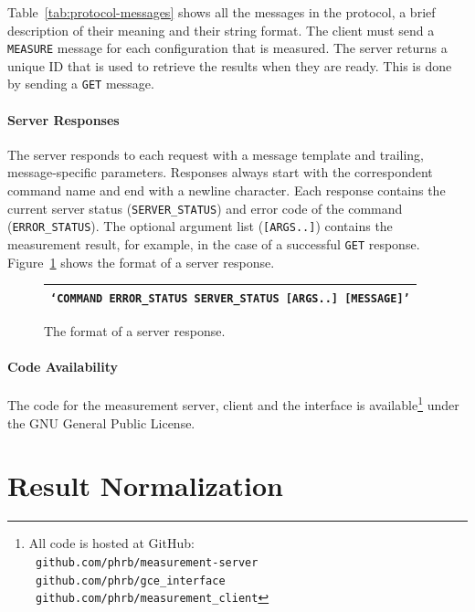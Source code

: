 \documentclass[a4paper, 12pt]{article}
\begin{document}
Table~\ref{tab:protocol-messages} shows all the messages in the protocol,
a brief description of their meaning and their string format. The client
must send a \texttt{\footnotesize MEASURE} message for each configuration
that is measured. The server returns a unique ID that is used to retrieve
the results when they are ready. This is done by sending a
\texttt{\footnotesize GET} message.

\paragraph{Server Responses}

The server responds to each request with a message template and
trailing, message-specific parameters. Responses always start
with the correspondent command name and end with a newline character.
Each response contains the current server status (\texttt{\footnotesize SERVER\_STATUS})
and error code of the command (\texttt{\footnotesize ERROR\_STATUS}).
The optional argument list (\texttt{\footnotesize [ARGS..]}) contains the
measurement result, for example, in the case of a successful
\texttt{\footnotesize GET} response. Figure~\ref{fig:response-template}
shows the format of a server response.

\begin{figure}[htpb]
    \centering
    \footnotesize
    \begin{tabular}{@{}c@{}}
        \toprule
        {\tt \lq{}COMMAND ERROR\_STATUS SERVER\_STATUS [ARGS..] [MESSAGE]\rq{}} \\ \bottomrule
    \end{tabular}
    \caption{The format of a server response.}
    \label{fig:response-template}
\end{figure}

\paragraph{Code Availability}

The code for the measurement server, client and the interface is
available\footnote{All code is hosted at GitHub: \\ \texttt{\scriptsize
github.com/phrb/measurement-server} \\ \texttt{\scriptsize
github.com/phrb/gce\_interface} \\ \texttt{\scriptsize
github.com/phrb/measurement\_client}} under the GNU General Public License.

\section{Result Normalization}
\label{sec:norm}
\end{document}
